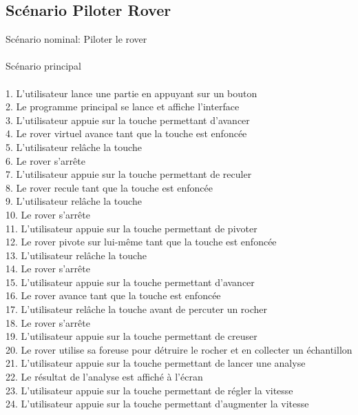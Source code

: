 \documentclass[12pt,a4paper]{scrartcl}
\begin{document}
\subsection{Scénario Piloter Rover}
Scénario nominal: Piloter le rover\\
\\
Scénario principal\\
\\
	1. L’utilisateur lance une partie en appuyant sur un bouton\\
	2. Le programme principal se lance et affiche l’interface\\
	3. L’utilisateur appuie sur la touche permettant d’avancer\\
	4. Le rover virtuel avance tant que la touche est enfoncée\\
	5. L’utilisateur relâche la touche\\
	6. Le rover s’arrête\\
	7. L’utilisateur appuie sur la touche permettant de reculer\\
	8. Le rover recule tant que la touche est enfoncée\\
	9. L’utilisateur relâche la touche\\
	10. Le rover s’arrête \\
	11. L’utilisateur appuie sur la touche permettant de pivoter\\
	12. Le rover pivote sur lui-même tant que la touche est enfoncée\\
	13. L’utilisateur relâche la touche\\
	14. Le rover s’arrête\\
	15. L’utilisateur appuie sur la touche permettant d’avancer\\
	16. Le rover avance tant que la touche est enfoncée\\
	17. L’utilisateur relâche la touche avant de percuter un rocher\\
	18. Le rover s’arrête\\
	19. L’utilisateur appuie sur la touche permettant de creuser\\
	20. Le rover utilise sa foreuse pour détruire le rocher et en collecter un échantillon\\
	21. L’utilisateur appuie sur la touche permettant de lancer une analyse\\
	22. Le résultat de l’analyse est affiché à l’écran\\
	23. L’utilisateur appuie sur la touche permettant de régler la vitesse\\
	24. L’utilisateur appuie sur la touche permettant d’augmenter la vitesse\\
\end{document}
